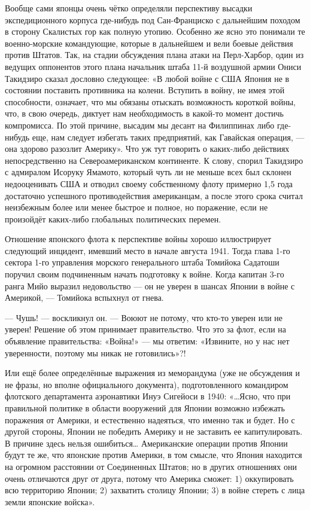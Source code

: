 Вообще сами японцы очень чётко определяли перспективу высадки экспедиционного корпуса где-нибудь под Сан-Франциско с дальнейшим походом в сторону Скалистых гор как полную утопию. Особенно же ясно это понимали те военно-морские командующие, которые в дальнейшем и вели боевые действия против Штатов. Так, на стадии обсуждения плана атаки на Перл-Харбор, один из ведущих оппонентов этого плана начальник штаба 11-й воздушной армии Ониси Такидзиро сказал дословно следующее: «В любой войне с США Япония не в состоянии поставить противника на колени. Вступить в войну, не имея этой способности, означает, что мы обязаны отыскать возможность короткой войны, что, в свою очередь, диктует нам необходимость в какой-то момент достичь компромисса. По этой причине, высадим мы десант на Филиппинах либо где-нибудь еще, нам следует избегать таких предприятий, как Гавайская операция, — она здорово разозлит Америку». Что уж тут говорить о каких-либо действиях непосредственно на Североамериканском континенте. К слову, спорил Такидзиро с адмиралом Исоруку Ямамото, который чуть ли не меньше всех был склонен недооценивать США и отводил своему собственному флоту примерно 1,5 года достаточно успешного противодействия американцам, а после этого срока считал неизбежным более или менее быстрое и полное, но поражение, если не произойдёт каких-либо глобальных политических перемен.

Отношение японского флота к перспективе войны хорошо иллюстрирует следующий инцидент, имевший место в начале августа 1941. Тогда глава 1-го сектора 1-го управления морского генерального штаба Томийока Садатоши поручил своим подчиненным начать подготовку к войне. Когда капитан 3-го ранга Мийо выразил недовольство — он не уверен в шансах Японии в войне с Америкой, — Томийока вспыхнул от гнева.

— Чушь! — воскликнул он. — Воюют не потому, что кто-то уверен или не уверен! Решение об этом принимает правительство. Что это за флот, если на объявление правительства: «Война!» — мы ответим: «Извините, но у нас нет уверенности, поэтому мы никак не готовились»?!

Или ещё более определённые выражения из меморандума (уже не обсуждения и не фразы, но вполне официального документа), подготовленного командиром флотского департамента аэронавтики Инуэ Сигейоси в 1940: «…Ясно, что при правильной политике в области вооружений для Японии возможно избежать поражения от Америки, и естественно надеяться, что именно так и будет. Но с другой стороны, Японии не победить Америку и не заставить ее капитулировать. В причине здесь нельзя ошибиться… Американские операции против Японии будут те же, что японские против Америки, в том смысле, что Япония находится на огромном расстоянии от Соединенных Штатов; но в других отношениях они очень отличаются друг от друга, потому что Америка сможет: 1) оккупировать всю территорию Японии; 2) захватить столицу Японии; 3) в войне стереть с лица земли японские войска».

